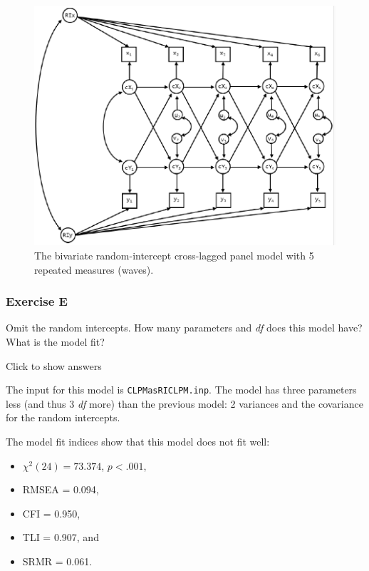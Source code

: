 \documentclass[
]{book}
\providecommand{\tightlist}{%
  \setlength{\itemsep}{0pt}\setlength{\parskip}{0pt}}
\begin{document}
\begin{figure}
\centering
\includegraphics[width=5.20833in,height=\textheight]{RICLPM-5waves.png}
\caption{The bivariate random-intercept cross-lagged panel model with 5 repeated measures (waves).}
\end{figure}

\hypertarget{exercise-e-1}{%
\subsubsection*{Exercise E}\label{exercise-e-1}}

Omit the random intercepts. How many parameters and \emph{df} does this model have? What is the model fit?

Click to show answers

The input for this model is \texttt{CLPMasRICLPM.inp}. The model has three parameters less (and thus 3 \emph{df} more) than the previous model: 2 variances and the covariance for the random intercepts.

The model fit indices show that this model does not fit well:

\begin{itemize}
\tightlist
\item
  \(\chi^{2} (24) = 73.374\), \(p < .001\),
\item
  RMSEA = 0.094,
\item
  CFI = 0.950,
\item
  TLI = 0.907, and
\item
  SRMR = 0.061.
\end{itemize}
\end{document}
